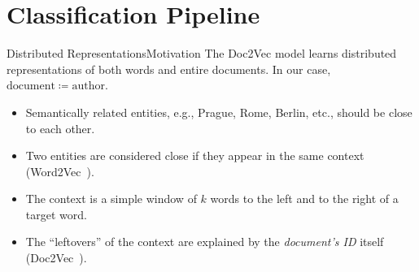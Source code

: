 \documentclass[usepdftitle=false]{beamer}
\begin{document}
\section{Classification Pipeline}

\begin{frame}{Distributed Representations}{Motivation}
  The \textsf{Doc2Vec} model learns distributed representations of
  both words and entire documents.  In our case,
  \(\mathrm{document} \coloneqq \mathrm{author}\).
  \begin{itemize}
  \item Semantically related entities, e.g., Prague, Rome, Berlin,
    etc., should be close to each other.
  \item Two entities are considered close if they appear in the same
    context (\textsf{Word2Vec}~\autocite{Mik13}).
  \item The context is a simple window of \(k\) words to the left and
    to the right of a target word.
  \item The \enquote{leftovers} of the context are explained by the
    \emph{document's ID} itself (\textsf{Doc2Vec}~\autocite{LM14}).
  \end{itemize}
\end{frame}
\end{document}
